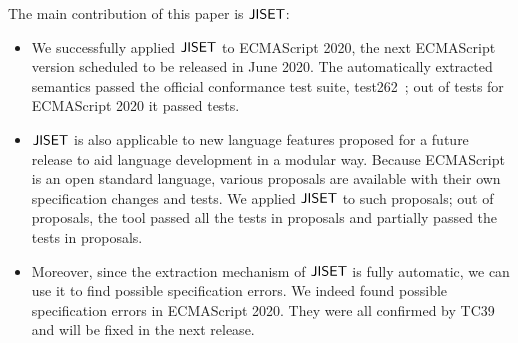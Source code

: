 The main contribution of this paper is \( \text{\sf JISET} \):
\begin{itemize}[leftmargin=0.5cm]
\item We successfully applied \( \text{\sf JISET} \) to ECMAScript 2020, the next
ECMAScript version scheduled to be released in June 2020.  The
automatically extracted semantics passed the official conformance test
suite, test262~\cite{test262}; out of  tests for
ECMAScript 2020 it passed  tests.
\item \( \text{\sf JISET} \) is also applicable to new language features proposed
for a future release to aid language development in a modular way.
Because ECMAScript is an open standard language, various proposals are
available with their own specification changes and tests.  We applied
\( \text{\sf JISET} \) to such proposals; out of  proposals, the tool
passed all the tests in  proposals and partially passed the
tests in  proposals.
\item Moreover, since the extraction mechanism of \( \text{\sf JISET} \) is fully
automatic, we can use it to find possible specification errors.  We
indeed found  possible specification errors in ECMAScript
2020.  They were all confirmed by TC39 and will be fixed in the next
release.
\end{itemize}
